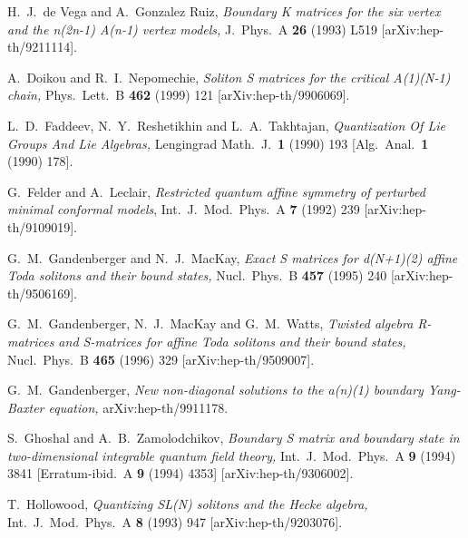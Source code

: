 \documentclass[a4paper,12pt]{article}
\numberwithin{equation}{section}
\begin{document}
{\begin{thebibliography}{99}
H.~J.~de Vega and A.~Gonzalez Ruiz, \textit{Boundary K matrices
for the six vertex and the n(2n-1) A(n-1) vertex models,} J.\
Phys.\ A {\bf 26} (1993) L519 [arXiv:hep-th/9211114].

A.~Doikou and R.~I.~Nepomechie, \textit{Soliton S matrices for the
critical A(1)(N-1) chain,} Phys.\ Lett.\ B {\bf 462} (1999) 121
[arXiv:hep-th/9906069].

L.~D.~Faddeev, N.~Y.~Reshetikhin and L.~A.~Takhtajan,
\textit{Quantization Of Lie Groups And Lie Algebras,} Lengingrad
Math.\ J.\  {\bf 1} (1990) 193 [Alg.\ Anal.\  {\bf 1} (1990) 178].

G.~Felder and A.~Leclair, \textit{Restricted quantum affine
symmetry of perturbed minimal conformal models}, Int.\ J.\ Mod.\
Phys.\ A {\bf 7} (1992) 239 [arXiv:hep-th/9109019].

G.~M.~Gandenberger and N.~J.~MacKay, \textit{Exact S matrices for
d(N+1)(2) affine Toda solitons and their bound states,} Nucl.\
Phys.\ B {\bf 457} (1995) 240 [arXiv:hep-th/9506169].

\bibitem{Gan96}
G.~M.~Gandenberger, N.~J.~MacKay and G.~M.~Watts, \textit{Twisted
algebra R-matrices and S-matrices for \coordHE{} affine Toda
solitons and their bound states,} Nucl.\ Phys.\ B {\bf 465} (1996)
329 [arXiv:hep-th/9509007].


G.~M.~Gandenberger, \textit{New non-diagonal solutions to the
a(n)(1) boundary Yang-Baxter  equation,} arXiv:hep-th/9911178.

\bibitem{Gho94}
S.~Ghoshal and A.~B.~Zamolodchikov, \textit{Boundary S matrix and
boundary state in two-dimensional integrable quantum field
theory,} Int.\ J.\ Mod.\ Phys.\ A {\bf 9} (1994) 3841
[Erratum-ibid.\ A {\bf 9} (1994) 4353] [arXiv:hep-th/9306002].


T.~Hollowood, \textit{Quantizing SL(N) solitons and the Hecke
algebra,} Int.\ J.\ Mod.\ Phys.\ A {\bf 8} (1993) 947
[arXiv:hep-th/9203076].



\end{thebibliography}}
\end{document}
